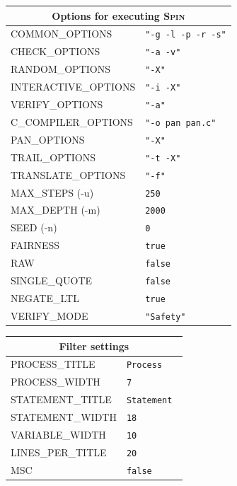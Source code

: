 \documentclass[11pt]{article}
\newcommand{\spn}{\textsc{Spin}}
\begin{document}
\begin{center}
\begin{tabular}{|p{}|p{}|}
\hline
\multicolumn{2}{|c|}{Options for executing \spn{}}\\ \hline
\textsc{\ttfamily COMMON\_OPTIONS} &\verb+"-g -l -p -r -s"+\\
\textsc{\ttfamily CHECK\_OPTIONS} &\verb+"-a -v"+\\
\textsc{\ttfamily RANDOM\_OPTIONS} &\verb+"-X"+\\
\textsc{\ttfamily INTERACTIVE\_OPTIONS} &\verb+"-i -X"+\\
\textsc{\ttfamily VERIFY\_OPTIONS} &\verb+"-a"+\\
\textsc{\ttfamily C\_COMPILER\_OPTIONS} &\verb+"-o pan pan.c"+\\
\textsc{\ttfamily PAN\_OPTIONS} &\verb+"-X"+\\
\textsc{\ttfamily TRAIL\_OPTIONS} &\verb+"-t -X"+\\
\textsc{\ttfamily TRANSLATE\_OPTIONS} &\verb+"-f"+\\
\textsc{\ttfamily MAX\_STEPS} {\ttfamily (-u)} &     \verb+250+\\
\textsc{\ttfamily MAX\_DEPTH} {\ttfamily (-m)} &     \verb+2000+\\
\textsc{\ttfamily SEED} {\ttfamily (-n)} &     \verb+0+\\
\textsc{\ttfamily FAIRNESS} &      \verb+true+\\
\textsc{\ttfamily RAW} & \verb+false+\\
\textsc{\ttfamily SINGLE\_QUOTE} &      \verb+false+\\
\textsc{\ttfamily NEGATE\_LTL} &      \verb+true+\\
\textsc{\ttfamily VERIFY\_MODE} &   \verb+"Safety"+\\\hline
\end{tabular}

\bigskip

\begin{tabular}{|p{}|p{}|}
\hline
\multicolumn{2}{|c|}{Filter settings}\\ \hline
\textsc{\ttfamily PROCESS\_TITLE} & \verb+Process +\\
\textsc{\ttfamily PROCESS\_WIDTH} & \verb+7+\\
\textsc{\ttfamily STATEMENT\_TITLE} & \verb+Statement +\\
\textsc{\ttfamily STATEMENT\_WIDTH} & \verb+18+\\
\textsc{\ttfamily VARIABLE\_WIDTH} &\verb+10+\\
\textsc{\ttfamily LINES\_PER\_TITLE} &\verb+20+\\
\textsc{\ttfamily MSC} &\verb+false+\\
\hline
\end{tabular}


\end{center}
\end{document}
